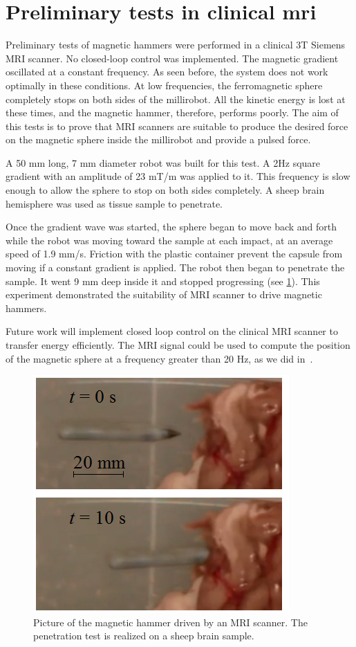 \documentclass[letterpaper, 10 pt, conference]{ieeeconf}  %
\begin{document}
\section{Preliminary tests in clinical mri}
\label{MRI_tests}
Preliminary tests of magnetic hammers were performed in a clinical 3T Siemens MRI scanner. 
No closed-loop control was implemented. 
The magnetic gradient  oscillated at a constant frequency. 
As seen before, the system does not work optimally in these conditions. 
At low frequencies, the ferromagnetic sphere completely stops on both sides of the millirobot. 
All the kinetic energy is lost at these times, and the magnetic hammer, therefore, performs poorly. 
The aim of this tests is to prove that MRI scanners are suitable to produce the desired force on the magnetic sphere inside the millirobot and provide a pulsed force.\par
A 50 mm long, 7 mm diameter robot was built for this test. 
A 2Hz square gradient with an amplitude of 23 mT/m was applied to it. 
This frequency is slow enough to allow the sphere to stop on both sides completely. 
A sheep brain hemisphere was used as tissue sample to penetrate.\par
Once the gradient wave was started, the sphere began to move back and forth while the robot was moving toward the sample at each impact, at an average speed of 1.9 mm/s. Friction with the plastic container prevent the capsule from moving if a constant gradient is applied. 
 The robot then began to penetrate the sample. It went 9 mm deep inside it and stopped progressing (see \cref{MRI_test}). 
This experiment demonstrated the suitability of MRI scanner to drive magnetic hammers. \par
Future work will implement closed loop control on the clinical MRI scanner to transfer energy efficiently. 
The MRI signal could be used to compute the position of the magnetic sphere at a frequency greater than 20 Hz, as we did in~\cite{578}.

\begin{figure}
\centering
  \includegraphics[width=150 pt]{tests_in_MRI.png}
  \caption{Picture of the magnetic hammer driven by an MRI scanner. The penetration test is realized on a sheep brain sample.}
  \label{MRI_test}
\end{figure}
\end{document}
